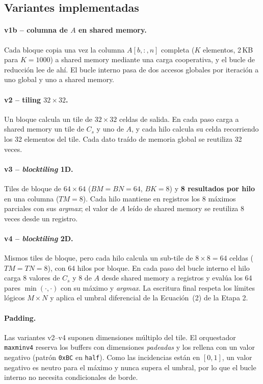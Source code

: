 \documentclass[11pt,a4paper]{article}
\begin{document}
\subsection{Variantes implementadas}

\paragraph{v1b -- columna de $A$ en shared memory.}
Cada bloque copia una vez la columna $A[b,:,n]$ completa ($K$ elementos, 2\,KB para
$K=\num{1000}$) a shared memory mediante una carga cooperativa, y el bucle de reducción lee
de ahí. El bucle interno pasa de dos accesos globales por iteración a uno global y uno a
shared memory.

\paragraph{v2 -- tiling $32\times32$.}
Un bloque calcula un tile de $32\times32$ celdas de salida. En cada paso carga a shared memory
un tile de $C_s$ y uno de $A$, y cada hilo calcula su celda recorriendo los 32 elementos del
tile. Cada dato traído de memoria global se reutiliza 32 veces.

\paragraph{v3 -- \emph{blocktiling} 1D.}
Tiles de bloque de $64\times64$ ($BM=BN=64$, $BK=8$) y \textbf{8 resultados por hilo} en una
columna ($TM=8$). Cada hilo mantiene en registros los 8 máximos parciales con sus
\emph{argmax}; el valor de $A$ leído de shared memory se reutiliza 8 veces desde un registro.

\paragraph{v4 -- \emph{blocktiling} 2D.}
Mismos tiles de bloque, pero cada hilo calcula un sub-tile de $8\times8 = 64$ celdas
($TM=TN=8$), con 64 hilos por bloque. En cada paso del bucle interno el hilo carga 8 valores
de $C_s$ y 8 de $A$ desde shared memory a registros y evalúa los 64 pares
$\min(\cdot,\cdot)$ con su máximo y \emph{argmax}. La escritura final respeta los límites
lógicos $M\times N$ y aplica el umbral diferencial de la Ecuación~(2) de la Etapa 2.

\paragraph{Padding.}
Las variantes v2--v4 suponen dimensiones múltiplo del tile. El orquestador
\texttt{maxminv4} reserva los buffers con dimensiones \emph{padeadas} y los rellena con un
valor negativo (patrón \texttt{0xBC} en \texttt{half}). Como las incidencias están en
$[0,1]$, un valor negativo es neutro para el máximo y nunca supera el umbral, por lo que el
bucle interno no necesita condicionales de borde.
\end{document}
